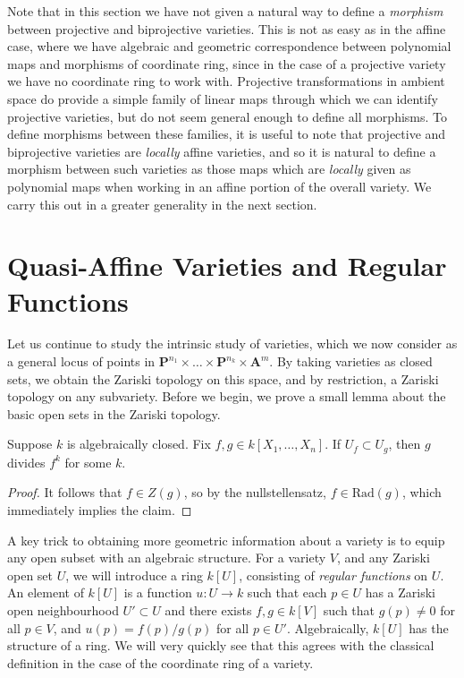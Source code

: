 Note that in this section we have not given a natural way to define a \emph{morphism} between projective and biprojective varieties. This is not as easy as in the affine case, where we have algebraic and geometric correspondence between polynomial maps and morphisms of coordinate ring, since in the case of a projective variety we have no coordinate ring to work with. Projective transformations in ambient space do provide a simple family of linear maps through which we can identify projective varieties, but do not seem general enough to define all morphisms. To define morphisms between these families, it is useful to note that projective and biprojective varieties are \emph{locally} affine varieties, and so it is natural to define a morphism between such varieties as those maps which are \emph{locally} given as polynomial maps when working in an affine portion of the overall variety. We carry this out in a greater generality in the next section.

\section{Quasi-Affine Varieties and Regular Functions}

Let us continue to study the intrinsic study of varieties, which we now consider as a general locus of points in $\mathbf{P}^{n_1} \times \dots \times \mathbf{P}^{n_k} \times \mathbf{A}^m$. By taking varieties as closed sets, we obtain the Zariski topology on this space, and by restriction, a Zariski topology on any subvariety. Before we begin, we prove a small lemma about the basic open sets in the Zariski topology.

\begin{lemma}
    Suppose $k$ is algebraically closed. Fix $f,g \in k[X_1,\dots,X_n]$. If $U_f \subset U_g$, then $g$ divides $f^k$ for some $k$.
\end{lemma}
\begin{proof}
    It follows that $f \in Z(g)$, so by the nullstellensatz, $f \in \text{Rad}(g)$, which immediately implies the claim.
\end{proof}

A key trick to obtaining more geometric information about a variety is to equip any open subset with an algebraic structure. For a variety $V$, and any Zariski open set $U$, we will introduce a ring $k[U]$, consisting of \emph{regular functions} on $U$. An element of $k[U]$ is a function $u: U \to k$ such that each $p \in U$ has a Zariski open neighbourhood $U' \subset U$ and there exists $f,g \in k[V]$ such that $g(p) \neq 0$ for all $p \in V$, and $u(p) = f(p)/g(p)$ for all $p \in U'$. Algebraically, $k[U]$ has the structure of a ring. We will very quickly see that this agrees with the classical definition in the case of the coordinate ring of a variety.

